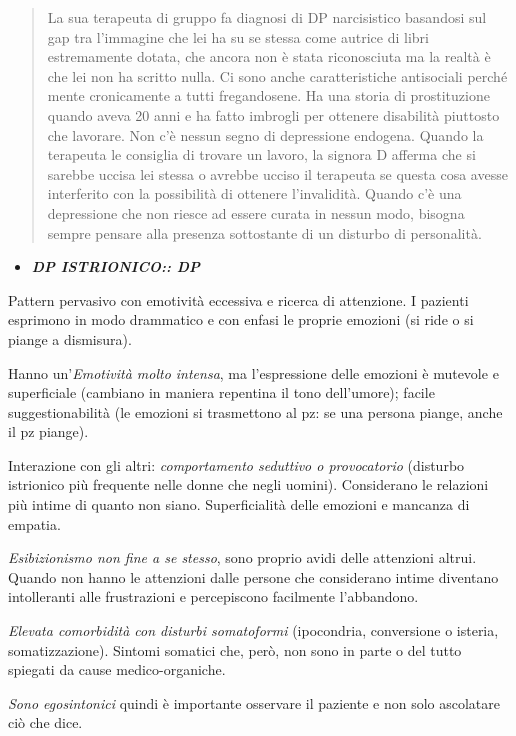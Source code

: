 \documentclass[]{article}
\begin{document}
\begin{quote}
La sua terapeuta di gruppo fa diagnosi di DP narcisistico basandosi sul
gap tra l'immagine che lei ha su se stessa come autrice di libri
estremamente dotata, che ancora non è stata riconosciuta ma la realtà è
che lei non ha scritto nulla. Ci sono anche caratteristiche antisociali
perché mente cronicamente a tutti fregandosene. Ha una storia di
prostituzione quando aveva 20 anni e ha fatto imbrogli per ottenere
disabilità piuttosto che lavorare. Non c'è nessun segno di depressione
endogena. Quando la terapeuta le consiglia di trovare un lavoro, la
signora D afferma che si sarebbe uccisa lei stessa o avrebbe ucciso il
terapeuta se questa cosa avesse interferito con la possibilità di
ottenere l'invalidità. Quando c'è una depressione che non riesce ad
essere curata in nessun modo, bisogna sempre pensare alla presenza
sottostante di un disturbo di personalità.
\end{quote}

\begin{itemize}
\item
  \textbf{\emph{DP ISTRIONICO:\emph{: DP}}}
\end{itemize}

Pattern pervasivo con emotività eccessiva e ricerca di attenzione. I
pazienti esprimono in modo drammatico e con enfasi le proprie emozioni
(si ride o si piange a dismisura).

Hanno un'\emph{Emotività molto intensa}, ma l'espressione delle emozioni
è mutevole e superficiale (cambiano in maniera repentina il tono
dell'umore); facile suggestionabilità (le emozioni si trasmettono al pz:
se una persona piange, anche il pz piange).

Interazione con gli altri: \emph{comportamento seduttivo o provocatorio}
(disturbo istrionico più frequente nelle donne che negli uomini).
Considerano le relazioni più intime di quanto non siano. Superficialità
delle emozioni e mancanza di empatia.

\emph{Esibizionismo non fine a se stesso}, sono proprio avidi delle
attenzioni altrui. Quando non hanno le attenzioni dalle persone che
considerano intime diventano intolleranti alle frustrazioni e
percepiscono facilmente l'abbandono.

\emph{Elevata comorbidità con disturbi somatoformi} (ipocondria,
conversione o isteria, somatizzazione). Sintomi somatici che, però, non
sono in parte o del tutto spiegati da cause medico-organiche.

\emph{Sono egosintonici} quindi è importante osservare il paziente e non
solo ascolatare ciò che dice.
\end{document}
